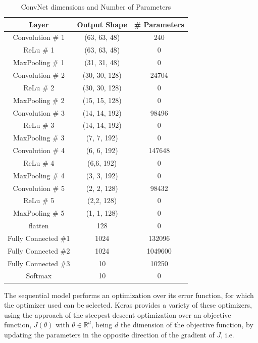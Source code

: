\begin{table}[h!]
    \centering
    \begin{tabular}{|c|c|c|}
        \hline
        \textbf{Layer} & \textbf{Output Shape} & \textbf{\# Parameters} \\
        \hline\hline
        Convolution \# 1 & (63, 63, 48) & 240 \\\hline
        ReLu \# 1 & (63, 63, 48) & 0 \\\hline
        MaxPooling \# 1 & (31, 31, 48) & 0 \\\hline
        Convolution \# 2 & (30, 30, 128) & 24704 \\\hline
        ReLu \# 2 & (30, 30, 128) & 0 \\\hline
        MaxPooling \# 2 & (15, 15, 128) & 0 \\\hline
        Convolution \# 3 & (14, 14, 192) & 98496 \\\hline
        ReLu \# 3 & (14, 14, 192) & 0 \\\hline
        MaxPooling \# 3 & (7, 7, 192) & 0 \\\hline
        Convolution \# 4 & (6, 6, 192) & 147648 \\\hline
        ReLu \# 4 & (6,6, 192) & 0 \\\hline
        MaxPooling \# 4 & (3, 3, 192) & 0 \\\hline
        Convolution \# 5 & (2, 2, 128) & 98432 \\\hline
        ReLu \# 5 & (2,2, 128) & 0 \\\hline
        MaxPooling \# 5 & (1, 1, 128) & 0 \\\hline
        flatten & 128 & 0 \\\hline
        Fully Connected \#1 & 1024 & 132096 \\\hline
        Fully Connected \#2 & 1024 & 1049600 \\\hline
        Fully Connected \#3 & 10 & 10250 \\\hline
        Softmax & 10 & 0 \\\hline
        \hline
    \end{tabular}
    \caption{ConvNet dimensions and Number of Parameters}
    \label{table:convnet_summary}
\end{table}

The sequential model performs an optimization over its error function, for which the optimizer used can be selected. Keras provides a variety of these optimizers, using the approach of the steepest descent optimization over an objective function, \(J(\theta)\) with \(\theta \in \mathbb{R}^{d}\), being \(d\) the dimension of the objective function, by updating the parameters in the opposite direction of the gradient of \(J\), i.e.

